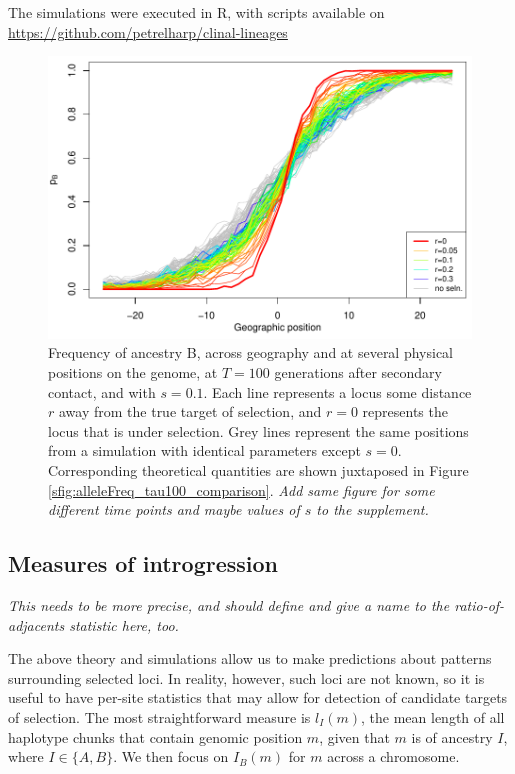 \documentclass[11pt,letterpaper]{article}
\newcommand{\plr}[1]{{\em \color{blue} #1}}
\begin{document}
The simulations were executed in R, with scripts available on
\url{https://github.com/petrelharp/clinal-lineages}

\begin{figure}
\includegraphics{figs/alleleFrequencies_sim}
\caption{
    Frequency of ancestry B,
    across geography and at several physical positions on the genome,
    at $T=100$ generations after secondary contact,
    and with $s=0.1$.
    Each line represents a locus some distance $r$ away from the true target of selection, 
    and $r=0$ represents the locus that is under selection. Grey lines represent the same positions from a simulation with
    identical parameters except $s=0$.
    Corresponding theoretical quantities are shown juxtaposed in Figure \ref{sfig:alleleFreq_tau100_comparison}.
    \plr{Add same figure for some different time points and maybe values of $s$ to the supplement.} 
}\label{alleleFreq_tau100}
\end{figure}

\subsection*{Measures of introgression}

\plr{This needs to be more precise, and should define and give a name to the ratio-of-adjacents statistic here, too.}

The above theory and simulations allow us to make predictions about patterns surrounding selected loci. In reality, however, such loci are not known, so it is useful to have per-site statistics that may allow for detection of candidate targets of selection. The most straightforward measure is $l_I(m)$,  the mean length of all haplotype chunks that contain genomic position $m$, given that $m$ is of ancestry $I$, where $I\in\{A,B\}$.
We then focus on $I_B(m)$ for $m$ across a chromosome. 
\end{document}

